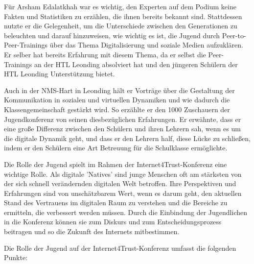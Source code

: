 Für Arsham Edalatkhah war es wichtig, den Experten auf dem Podium keine Fakten und Statistiken zu erzählen, die ihnen bereits bekannt sind. Stattdessen nutzte er die Gelegenheit, um die Unterschiede zwischen den Generationen zu beleuchten und darauf hinzuweisen, wie wichtig es ist, die Jugend durch Peer-to-Peer-Trainings über das Thema Digitalisierung und soziale Medien aufzuklären. Er selber hat bereits Erfahrung mit diesem Thema, da er selbst die Peer-Trainings an der HTL Leonding absolviert hat und den jüngeren Schülern der HTL Leonding Unterstützung bietet.

Auch in der NMS-Hart in Leonding hält er Vorträge über die Gestaltung der Kommunikation in sozialen und virtuellen Dynamiken und wie dadurch die Klassengemeinschaft gestärkt wird. So erzählte er den 1000 Zuschauern der Jugendkonferenz von seinen diesbezüglichen Erfahrungen. Er erwähnte, dass er eine große Differenz zwischen den Schülern und ihren Lehrern sah, wenn es um die digitale Dynamik geht, und dass er den Lehrern half, diese Lücke zu schließen, indem er den Schülern eine Art Betreuung für die Schulklasse ermöglichte.

Die Rolle der Jugend spielt im Rahmen der Internet4Trust-Konferenz eine wichtige Rolle. Als digitale 'Natives' sind junge Menschen oft am stärksten von der sich schnell verändernden digitalen Welt betroffen. Ihre Perspektiven und Erfahrungen sind von unschätzbarem Wert, wenn es darum geht, den aktuellen Stand des Vertrauens im digitalen Raum zu verstehen und die Bereiche zu ermitteln, die verbessert werden müssen. Durch die Einbindung der Jugendlichen in die Konferenz können sie zum Diskurs und zum Entscheidungsprozess beitragen und so die Zukunft des Internets mitbestimmen.


Die Rolle der Jugend auf der Internet4Trust-Konferenz umfasst die folgenden Punkte:

